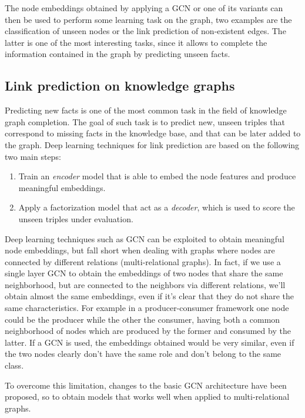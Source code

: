 \documentclass[%
    corpo=13.5pt,
    twoside,
    oldstyle,
    tipotesi=magistrale,
    greek,
    evenboxes
]{toptesi}
\begin{document}
The node embeddings obtained by applying a GCN or one of its variants can
then be used to perform some learning task on the graph, two examples are
the classification of unseen nodes or the link prediction of non-existent
edges. The latter is one of the most interesting tasks, since it allows to
complete the information contained in the graph by predicting unseen facts.

\subsection{Link prediction on knowledge graphs}
\label{subsec:linkprediction}

Predicting new facts is one of the most common task in the field
of knowledge graph completion. The goal of such task is to predict new, unseen
triples that correspond to missing facts in the knowledge base, and that can be
later added to the graph.
Deep learning techniques for link prediction are based on the following two
main steps:

\begin{enumerate}
    \item Train an \emph{encoder} model
    that is able to embed the node features and produce meaningful embeddings.
    \item Apply a factorization model that act as a \emph{decoder}, which is
    used to score the unseen triples under evaluation.
\end{enumerate}

Deep learning techniques such as GCN can be exploited to obtain meaningful
node embeddings, but fall short when dealing with graphs where
nodes are connected by different relations (multi-relational graphs).
In fact, if we use a single layer GCN to obtain the embeddings of two nodes
that share the same neighborhood, but are connected to the neighbors via
different relations, we'll obtain almost the same embeddings, even if it's
clear that they do not share the same characteristics. For example in a
producer-consumer framework one node could be the producer while the other
the consumer, having both a common neighborhood of nodes
which are produced by the former and consumed by the latter.
If a GCN is used, the embeddings obtained would be very similar, even if
the two nodes clearly don't have the same role and don't belong to the
same class.

To overcome this limitation, changes to the basic GCN architecture have been
proposed, so to obtain models that works well when applied to multi-relational
graphs.
\newline
\end{document}
